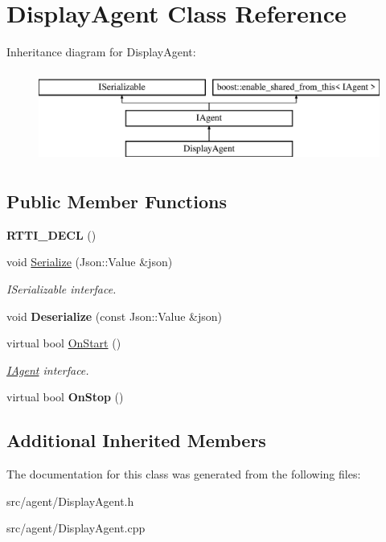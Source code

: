 \hypertarget{class_display_agent}{}\section{Display\+Agent Class Reference}
\label{class_display_agent}
Inheritance diagram for Display\+Agent\+:\begin{figure}[H]
\begin{center}
\leavevmode
\includegraphics[height=3.000000cm]{class_display_agent}
\end{center}
\end{figure}
\subsection*{Public Member Functions}
\begin{DoxyCompactItemize}
\item 
\mbox{\label{class_display_agent_a16531a8ef93495143494ca0ae6c7e689}} 
{\bfseries R\+T\+T\+I\+\_\+\+D\+E\+CL} ()
\item 
\mbox{\label{class_display_agent_a03531a5286a1f5c9436903d0fdbae013}} 
void \hyperlink{class_display_agent_a03531a5286a1f5c9436903d0fdbae013}{Serialize} (Json\+::\+Value \&json)
\begin{DoxyCompactList}\small\item\em I\+Serializable interface. \end{DoxyCompactList}\item 
\mbox{\label{class_display_agent_aa0072c3096aa9982c75a79de09bbb1eb}} 
void {\bfseries Deserialize} (const Json\+::\+Value \&json)
\item 
\mbox{\label{class_display_agent_a0250faa8d9b893fca60982a480ab9ac0}} 
virtual bool \hyperlink{class_display_agent_a0250faa8d9b893fca60982a480ab9ac0}{On\+Start} ()
\begin{DoxyCompactList}\small\item\em \hyperlink{class_i_agent}{I\+Agent} interface. \end{DoxyCompactList}\item 
\mbox{\label{class_display_agent_a86e4ad8c90b707f3f8206b15b3cdf609}} 
virtual bool {\bfseries On\+Stop} ()
\end{DoxyCompactItemize}
\subsection*{Additional Inherited Members}


The documentation for this class was generated from the following files\+:\begin{DoxyCompactItemize}
\item 
src/agent/Display\+Agent.\+h\item 
src/agent/Display\+Agent.\+cpp\end{DoxyCompactItemize}
